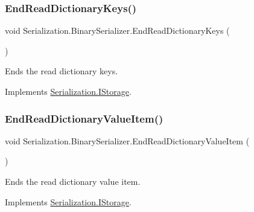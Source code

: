 \subsubsection{\texorpdfstring{End\+Read\+Dictionary\+Keys()}{EndReadDictionaryKeys()}}
{\footnotesize\ttfamily void Serialization.\+Binary\+Serializer.\+End\+Read\+Dictionary\+Keys (\begin{DoxyParamCaption}{ }\end{DoxyParamCaption})\hspace{0.3cm}{\ttfamily [inline]}}



Ends the read dictionary keys. 



Implements \hyperlink{interface_serialization_1_1_i_storage_a4d7be7471ebc9555ec62f3d1e91b53a8}{Serialization.\+I\+Storage}.

\mbox{\label{class_serialization_1_1_binary_serializer_aa8214913ce84b050614e38c5aadc0b71}} 
\subsubsection{\texorpdfstring{End\+Read\+Dictionary\+Value\+Item()}{EndReadDictionaryValueItem()}}
{\footnotesize\ttfamily void Serialization.\+Binary\+Serializer.\+End\+Read\+Dictionary\+Value\+Item (\begin{DoxyParamCaption}{ }\end{DoxyParamCaption})\hspace{0.3cm}{\ttfamily [inline]}}



Ends the read dictionary value item. 



Implements \hyperlink{interface_serialization_1_1_i_storage_a34f240c50bd8a6811cdde7d564fab443}{Serialization.\+I\+Storage}.

\mbox{\label{class_serialization_1_1_binary_serializer_a37b4e1255ab937e041a3c8d0786b461c}} 
